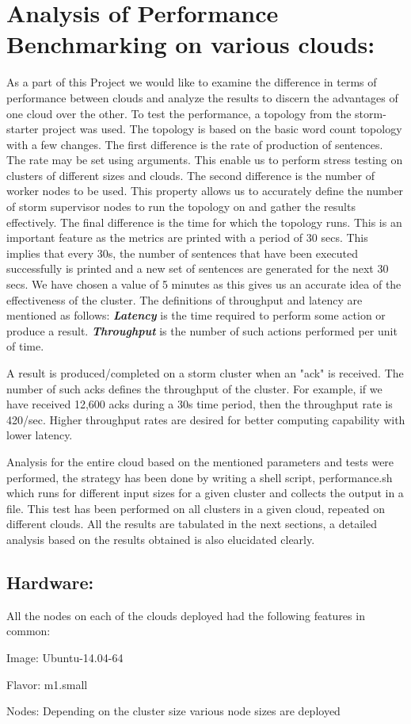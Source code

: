 \documentclass[9pt,twocolumn,twoside]{../../styles/osajnl}
\begin{document}
\section{Analysis of Performance Benchmarking on various clouds:}
As a part of this Project we would like to examine the difference in
terms of performance between clouds and analyze the results to discern
the advantages of one cloud over the other. To test the performance, a
topology from the storm-starter project was used. The topology is
based on the basic word count topology with a few changes. The first
difference is the rate of production of sentences. The rate may be set
using arguments. This enable us to perform stress testing on clusters
of different sizes and clouds. The second difference is the number of
worker nodes to be used. This property allows us to accurately define
the number of storm supervisor nodes to run the topology on and gather
the results effectively. The final difference is the time for which
the topology runs. This is an important feature as the metrics are
printed with a period of 30 secs. This implies that every 30s, the
number of sentences that have been executed successfully is printed
and a new set of sentences are generated for the next 30 secs. We have
chosen a value of 5 minutes as this gives us an accurate idea of the
effectiveness of the cluster. The definitions of throughput and
latency are mentioned as follows: \textbf{\textit{Latency}} is the
time required to perform some action or produce a result.
\textbf{\textit{Throughput}} is the number of such actions performed
per unit of time.

A result is produced/completed on a storm cluster when an "ack" is
received. The number of such acks defines the throughput of the
cluster. For example, if we have received 12,600 acks during a 30s
time period, then the throughput rate is 420/sec. Higher throughput
rates are desired for better computing capability with lower latency.


Analysis for the entire cloud based on the mentioned parameters and
tests were performed, the strategy has been done by writing a shell
script, performance.sh which runs for different input sizes for a
given cluster and collects the output in a file. This test has been
performed on all clusters in a given cloud, repeated on different
clouds. All the results are tabulated in the next sections, a detailed
analysis based on the results obtained is also elucidated clearly.



\subsection{Hardware:}
All the nodes on each of the clouds deployed had the following features in 
common:
\begin{description}
\item Image: Ubuntu-14.04-64
\item Flavor: m1.small
\item Nodes: Depending on the cluster size various node sizes are deployed
\end{description}
\end{document}
